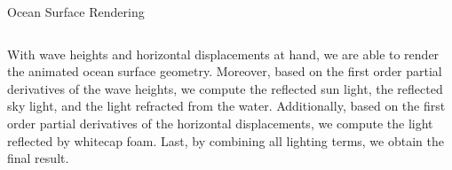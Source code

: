 \documentclass[final,hyperref={pdfpagelabels=true}]{beamer}
\begin{document}
\begin{frame}
\begin{center}
\begin{minipage}{0.99\textwidth}
\begin{block}{Ocean Surface Rendering}
			\begin{columns}[t]
				\begin{column}{0.95\linewidth}
					With wave heights and horizontal displacements at hand, we are able to render the
					animated ocean surface geometry. Moreover, based on the first order partial derivatives of
					the wave heights, we compute the reflected sun light, the reflected sky light, and the light
					refracted from the water.
					Additionally, based on the first order partial derivatives of the horizontal
					displacements, we compute the light reflected by whitecap foam.
					Last, by combining all lighting terms, we obtain the final result.
					\begin{figure}
					\centering

\end{figure}
\end{column}
\end{columns}
\end{block}
\end{minipage}
\end{center}
\end{frame}
\end{document}
